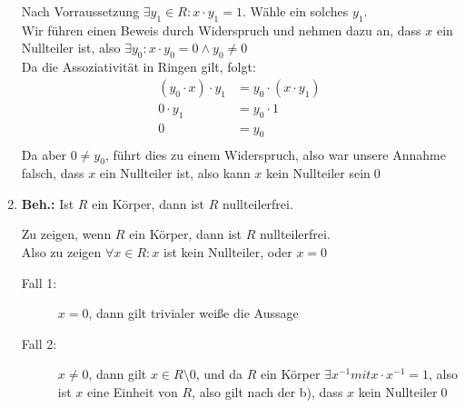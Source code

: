 \documentclass{gadsescript}
\begin{document}
\begin{enumerate}[label=(\alph*)]
\begin{proof*}
			Nach Vorraussetzung $ \exists y_1 \in R : x \cdot y_1 = 1 $. Wähle ein solches $ y_1 $.\\
			Wir führen einen Beweis durch Widerspruch und nehmen dazu an, dass $ x $ ein Nullteiler ist, also $ \exists y_0 : x \cdot y_0 = 0 \wedge y_0 \neq 0 $\\
			Da die Assoziativität in Ringen gilt, folgt:
			\begin{align*}
				(y_0 \cdot x)\cdot y_1 &= y_0\cdot (x \cdot y_1) \\
				0 \cdot y_1 &= y_0 \cdot 1 \\
				0 &= y_0 \\
			\end{align*}
			Da aber $ 0 \neq y_0 $, führt dies zu einem Widerspruch, also war unsere Annahme falsch, dass $ x $ ein Nullteiler ist, also kann $ x $ kein Nullteiler sein\qed
		\end{proof*}
	\item \textbf{Beh.:} Ist $ R $ ein Körper, dann ist $ R $ nullteilerfrei.
		\begin{proof*}
			Zu zeigen, wenn $ R $ ein Körper, dann ist $ R $ nullteilerfrei.\\
			Also zu zeigen $ \forall x \in R : x $ ist kein Nullteiler, oder $ x = 0 $\\
			\begin{description}
				\item[Fall 1:] $ x = 0 $, dann gilt trivialer weiße die Aussage
				\item[Fall 2:] $ x \neq 0 $, dann gilt $ x \in R\setminus{0} $, und da $ R $ ein Körper $ \exists x^{-1} mit x \cdot x^{-1} = 1 $, also ist $ x $ eine Einheit von $ R $, also gilt nach der b), dass $ x $ kein Nullteiler\qed
			\end{description}
			
		\end{proof*}
		
\end{enumerate}
\end{document}
